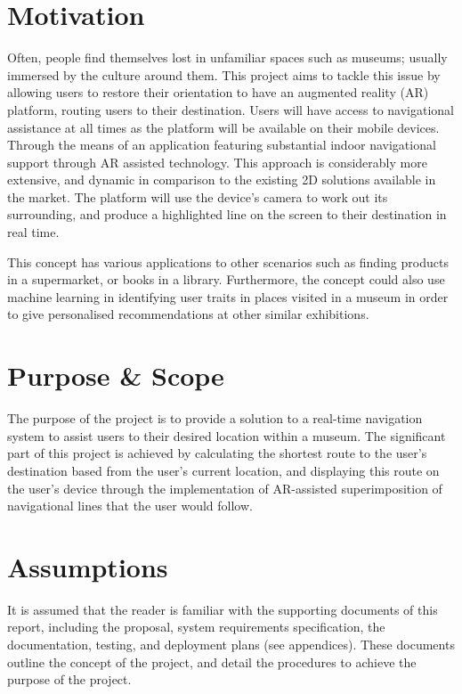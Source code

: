 \section{Motivation}
Often, people find themselves lost in unfamiliar spaces such as museums; usually immersed by the culture around them. This project aims to tackle this issue by allowing users to restore their orientation to have an augmented reality (AR) platform, routing users to their destination. Users will have access to navigational assistance at all times as the platform will be available on their mobile devices. Through the means of an application featuring substantial indoor navigational support through AR assisted technology. This approach is considerably more extensive, and dynamic in comparison to the existing 2D solutions available in the market. The platform will use the device's camera to work out its surrounding, and produce a highlighted line on the screen to their destination in real time.

This concept has various applications to other scenarios such as finding products in a supermarket, or books in a library. Furthermore, the concept could also use machine learning in identifying user traits in places visited in a museum in order to give personalised recommendations at other similar exhibitions.

\section{Purpose \& Scope}
The purpose of the project is to provide a solution to a real-time navigation system to assist users to their desired location within a museum. The significant part of this project is achieved by calculating the shortest route to the user's destination based from the user's current location, and displaying this route on the user's device through the implementation of AR-assisted superimposition of navigational lines that the user would follow.

\section{Assumptions}
It is assumed that the reader is familiar with the supporting documents of this report, including the proposal, system requirements specification, the documentation, testing, and deployment plans (see appendices). These documents outline the concept of the project, and detail the procedures to achieve the purpose of the project.

